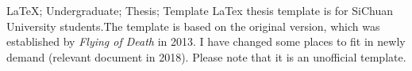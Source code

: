 \makecover

\begin{abstract}{\LaTeX; 本科; 毕业论文; 模板}
四川大学本科毕业论文（设计）模板。
\end{abstract}


\begin{abstractEng}{\LaTeX; Undergraduate; Thesis; Template}
LaTex thesis template is for SiChuan University students.The template is 
based on the original version, which was established by \textit{Flying of Death} in 2013. I have changed some places to fit in newly demand
(relevant document in 2018). Please note that it is an unofficial 
template. 
\end{abstractEng}


\tableofcontents